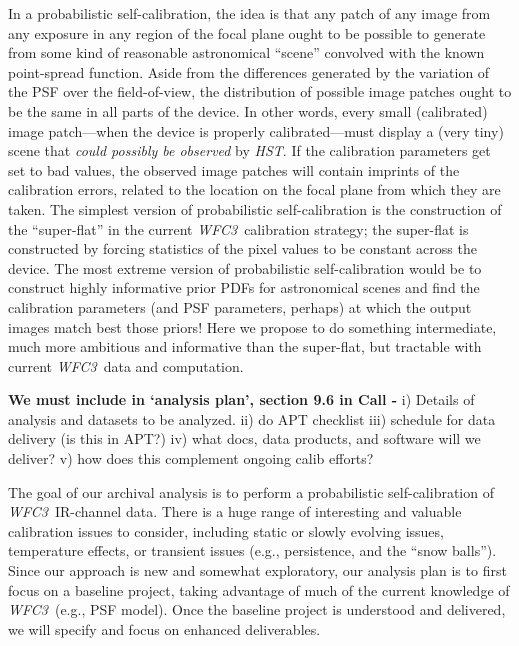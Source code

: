 \documentclass[12pt]{article}
\newcommand{\project}[1]{\textsl{#1}}
\newcommand{\HST}{\project{HST}}
\newcommand{\WFC}{\project{WFC3}}
\begin{document}
In a probabilistic self-calibration, the idea is that any patch of any
image from any exposure in any region of the focal plane ought to be
possible to generate from some kind of reasonable astronomical
``scene'' convolved with the known point-spread function.  Aside from
the differences generated by the variation of the PSF over the
field-of-view, the distribution of possible image patches ought to be
the same in all parts of the device.  In other words, every small
(calibrated) image patch---when the device is properly
calibrated---must display a (very tiny) scene that \emph{could
  possibly be observed} by \HST.  If the calibration parameters get
set to bad values, the observed image patches will contain imprints of
the calibration errors, related to the location on the focal plane
from which they are taken.  The simplest version of probabilistic
self-calibration is the construction of the ``super-flat'' in the
current \WFC\ calibration strategy; the super-flat is constructed by
forcing statistics of the pixel values to be constant across the
device.  The most extreme version of probabilistic self-calibration
would be to construct highly informative prior PDFs for astronomical
scenes and find the calibration parameters (and PSF parameters,
perhaps) at which the output images match best those priors!  Here we
propose to do something intermediate, much more ambitious and
informative than the super-flat, but tractable with current \WFC\ data
and computation.

%
%
\describearchival       %


{\color{red} \textbf{We must include in `analysis plan', section 9.6 in Call -} 
i) Details of analysis and datasets to be analyzed.  ii) do APT
checklist iii) schedule for data delivery (is this in APT?) iv) what
docs, data products, and software will we deliver? v) how does this 
complement ongoing calib efforts?}

The goal of our archival analysis is to perform a probabilistic
self-calibration of \WFC\ IR-channel data.  There is a huge range of interesting
and valuable calibration issues to consider, including static or slowly 
evolving issues, temperature effects, or transient
issues (e.g., persistence, and the ``snow balls'').  Since our approach is
new and somewhat exploratory, our analysis plan is to first focus on
a baseline project, taking advantage of much of the current
knowledge of \WFC\ (e.g., PSF model).  Once the baseline project is understood
and delivered, we will specify and focus on enhanced deliverables.
\end{document}
